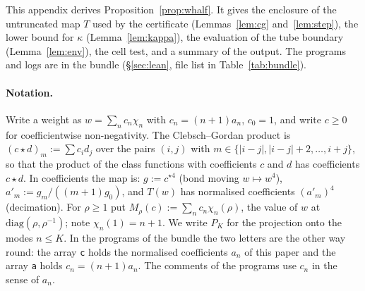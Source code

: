 \documentclass[11pt,a4paper]{article}
\theoremstyle{definition}
\theoremstyle{remark}
\newcommand{\code}[1]{\texttt{#1}}
\begin{document}
This appendix derives Proposition~\ref{prop:whalf}.
It gives the enclosure of the untruncated map $T$ used by the certificate (Lemmas~\ref{lem:cg} and~\ref{lem:step}), the lower bound for $\kappa$ (Lemma~\ref{lem:kappa}), the evaluation of the tube boundary (Lemma~\ref{lem:env}), the cell test, and a summary of the output.
The programs and logs are in the bundle (\S\ref{sec:lean}, file list in Table~\ref{tab:bundle}).

\paragraph{Notation.}
Write a weight as $w=\sum_nc_n\chi_n$ with $c_n=(n+1)a_n$, $c_0=1$, and write $c\ge0$ for coefficientwise non-negativity.
The Clebsch--Gordan product is $(c\star d)_m:=\sum c_id_j$ over the pairs $(i,j)$ with $m\in\{|i-j|,|i-j|+2,\dots,i+j\}$, so that the product of the class functions with coefficients $c$ and $d$ has coefficients $c\star d$.
In coefficients the map is: $g:=c^{\star4}$ (bond moving $w\mapsto w^4$), $a'_m:=g_m/((m+1)g_0)$, and $T(w)$ has normalised coefficients $(a'_m)^4$ (decimation).
For $\rho\ge1$ put $M_\rho(c):=\sum_nc_n\chi_n(\rho)$, the value of $w$ at $\mathrm{diag}(\rho,\rho^{-1})$; note $\chi_n(1)=n+1$.
We write $P_K$ for the projection onto the modes $n\le K$.
In the programs of the bundle the two letters are the other way round: the array \code{c} holds the normalised coefficients $a_n$ of this paper and the array \code{a} holds $c_n=(n+1)a_n$.
The comments of the programs use $c_n$ in the sense of $a_n$.
\end{document}
